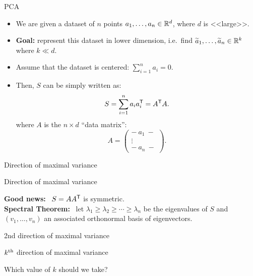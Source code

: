 \documentclass{beamer}
\begin{document}
\begin{frame}[t]{PCA}
	\grid

	\begin{itemize}
		\item We are given a dataset of $n$ points $a_1, \dots, a_n \in \mathbb{R}^d$, where $d$ is <<large>>.
			\vspace{0.1cm}
		\item \textbf{Goal:} represent this dataset in lower dimension, i.e.\ find $\widetilde{a}_1, \dots, \widetilde{a}_n \in \mathbb{R}^k$ where $k \ll d$.
			\vspace{0.1cm}
		\item Assume that the dataset is centered: $\sum_{i=1}^n a_i = 0$.
			\vspace{0.1cm}
		\item Then, $S$ can be simply written as:
			$$
			S = \sum_{i=1}^n a_i a_i^{{\sf T}}
			= A^{{\sf T}} A.
			$$
			where $A$ is the $n\times d$ ``data matrix'':
			$$
			A =
			\begin{pmatrix}
				- \ a_1 \ - \\
				\vdots  \\
				- \ a_n \ -
			\end{pmatrix}
			.
			$$
	\end{itemize}
\end{frame}

\begin{frame}[t]{Direction of maximal variance}
	\grid
	\pause

\end{frame}
\begin{frame}[t]{Direction of maximal variance}
	\grid

	\textbf{Good news:} \ $S = AA^{{\sf T}}$ is symmetric.
	\\

	\textbf{Spectral Theorem:} \ let $\lambda_1 \geq \lambda_2 \geq \cdots \geq \lambda_n$ be the eigenvalues of $S$ and $(v_1, \dots, v_n)$ an associated orthonormal basis of eigenvectors.

\end{frame}
\begin{frame}[t]{2nd direction of maximal variance}
	\grid

\end{frame}
\begin{frame}[t]{$k^{\rm th}$ direction of maximal variance}
	\grid

\end{frame}

\begin{frame}[t]{Which value of $k$ should we take?}
	\grid

\end{frame}
\end{document}
